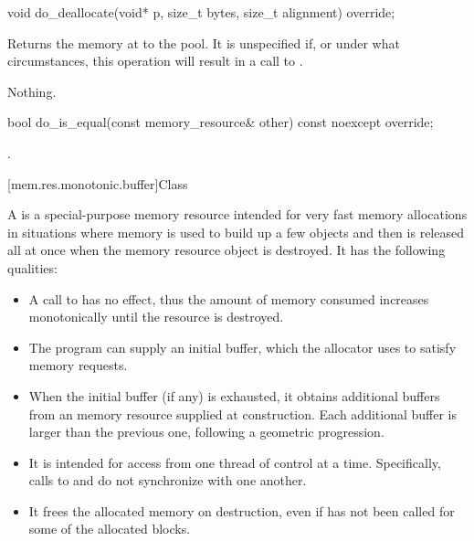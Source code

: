 %
%
\begin{itemdecl}
void do_deallocate(void* p, size_t bytes, size_t alignment) override;
\end{itemdecl}

\begin{itemdescr}
\pnum
\effects
Returns the memory at  to the pool.
It is unspecified if, or under what circumstances,
this operation will result in a call to .

\pnum
\throws
Nothing.
\end{itemdescr}

%
%
\begin{itemdecl}
bool do_is_equal(const memory_resource& other) const noexcept override;
\end{itemdecl}

\begin{itemdescr}
\pnum
\returns
{}.
\end{itemdescr}

[mem.res.monotonic.buffer]{Class }

\pnum
A  is a special-purpose memory resource
intended for very fast memory allocations in situations
where memory is used to build up a few objects
and then is released all at once when the memory resource object is destroyed.
It has the following qualities:
\begin{itemize}
\item
A call to  has no effect,
thus the amount of memory consumed increases monotonically
until the resource is destroyed.
\item
The program can supply an initial buffer,
which the allocator uses to satisfy memory requests.
\item
When the initial buffer (if any) is exhausted,
it obtains additional buffers from an  memory resource
supplied at construction.
Each additional buffer is larger than the previous one,
following a geometric progression.
\item
It is intended for access from one thread of control at a time.
Specifically, calls to  and 
do not synchronize with one another.
\item
It frees the allocated memory on destruction,
even if  has not been called for some of the allocated blocks.
\end{itemize}

